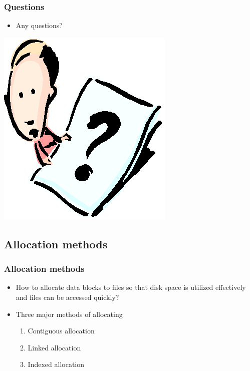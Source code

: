 \documentclass[CJKutf8,xcolor=pdftex,dvipsnames,table]{beamer}
\begin{document}
\begin{CJK*}{UTF8}{song}
  \begin{frame}
    \frametitle{Questions}
    \begin{itemize}
    \item Any questions?
    \end{itemize}
    \begin{center}
      \includegraphics[scale=.5]{question}
    \end{center}
  \end{frame}

  \subsection{Allocation methods}
  
  \begin{frame}
    \frametitle{Allocation methods} \pause
    \begin{itemize}\parskip=0pt
    \item How to allocate data blocks to files so that disk space is utilized effectively and files can be accessed quickly? \pause
    \item Three major methods of allocating \pause
      \begin{enumerate}\parskip=0pt
      \item Contiguous allocation \pause
      \item Linked allocation \pause
      \item Indexed allocation
      \end{enumerate}
    \end{itemize}
  \end{frame}
  

\end{CJK*}
\end{document}
